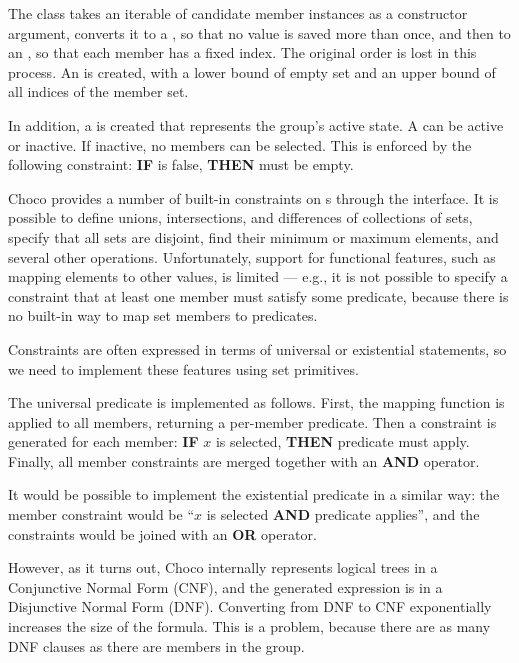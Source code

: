 The class takes an iterable of candidate member instances as a constructor argument,
converts it to a , so that no value is saved more than once, and then to an
, so that each member has a fixed index. The original order is lost in
this process. An  is created, with a lower bound of empty set
and an upper bound of all indices of the member set.

In addition, a  is created that represents the group's active
state. A  can be active or inactive. If inactive, no members can be
selected. This is enforced by the following constraint: \textbf{IF}  is
false, \textbf{THEN}  must be empty.

\medskip

Choco provides a number of built-in constraints on s through the
 interface. It is possible to define unions, intersections,
and differences of collections of sets, specify that all sets are disjoint, find their
minimum or maximum elements, and several other operations. Unfortunately, support for
functional features, such as mapping elements to other values, is limited --- e.g., it
is not possible to specify a constraint that at least one member must satisfy some
predicate, because there is no built-in way to map set members to predicates.

Constraints are often expressed in terms of universal or existential statements, so we
need to implement these features using set primitives.

\medskip

The universal predicate  is implemented as follows.
First, the mapping function  is applied to all members, returning a per-member
predicate. Then a constraint is generated for each member: \textbf{IF} $x$ is selected,
\textbf{THEN} predicate must apply. Finally, all member constraints are merged together
with an \textbf{AND} operator.

\medskip

It would be possible to implement the existential predicate  in a similar
way: the member constraint would be ``$x$ is selected \textbf{AND} predicate applies'',
and the constraints would be joined with an \textbf{OR} operator.

However, as it turns out, Choco internally represents logical trees in a Conjunctive
Normal Form (CNF), and the generated expression is in a Disjunctive Normal Form (DNF).
Converting from DNF to CNF exponentially increases the size of the formula. This is a
problem, because there are as many DNF clauses as there are members in the group.

